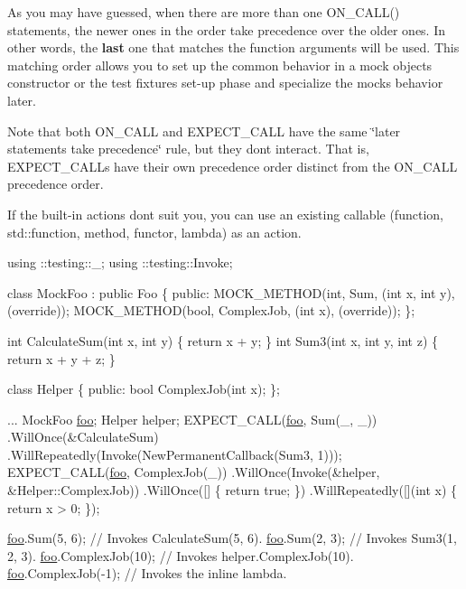 As you may have guessed, when there are more than one {\ttfamily O\+N\+\_\+\+C\+A\+L\+L()} statements, the newer ones in the order take precedence over the older ones. In other words, the {\bfseries last} one that matches the function arguments will be used. This matching order allows you to set up the common behavior in a mock object\textquotesingle{}s constructor or the test fixture\textquotesingle{}s set-\/up phase and specialize the mock\textquotesingle{}s behavior later.

Note that both {\ttfamily O\+N\+\_\+\+C\+A\+LL} and {\ttfamily E\+X\+P\+E\+C\+T\+\_\+\+C\+A\+LL} have the same \char`\"{}later statements take
precedence\char`\"{} rule, but they don\textquotesingle{}t interact. That is, {\ttfamily E\+X\+P\+E\+C\+T\+\_\+\+C\+A\+LL}s have their own precedence order distinct from the {\ttfamily O\+N\+\_\+\+C\+A\+LL} precedence order.

If the built-\/in actions don\textquotesingle{}t suit you, you can use an existing callable (function, {\ttfamily std\+::function}, method, functor, lambda) as an action.


\begin{DoxyCode}
using ::testing::\_; using ::testing::Invoke;

\textcolor{keyword}{class }MockFoo : \textcolor{keyword}{public} Foo \{
 \textcolor{keyword}{public}:
  MOCK\_METHOD(\textcolor{keywordtype}{int}, Sum, (\textcolor{keywordtype}{int} x, \textcolor{keywordtype}{int} y), (\textcolor{keyword}{override}));
  MOCK\_METHOD(\textcolor{keywordtype}{bool}, ComplexJob, (\textcolor{keywordtype}{int} x), (\textcolor{keyword}{override}));
\};

\textcolor{keywordtype}{int} CalculateSum(\textcolor{keywordtype}{int} x, \textcolor{keywordtype}{int} y) \{ \textcolor{keywordflow}{return} x + y; \}
\textcolor{keywordtype}{int} Sum3(\textcolor{keywordtype}{int} x, \textcolor{keywordtype}{int} y, \textcolor{keywordtype}{int} z) \{ \textcolor{keywordflow}{return} x + y + z; \}

\textcolor{keyword}{class }Helper \{
 \textcolor{keyword}{public}:
  \textcolor{keywordtype}{bool} ComplexJob(\textcolor{keywordtype}{int} x);
\};

...
  MockFoo \mbox{\hyperlink{namespacefoo}{foo}};
  Helper helper;
  EXPECT\_CALL(\mbox{\hyperlink{namespacefoo}{foo}}, Sum(\_, \_))
      .WillOnce(&CalculateSum)
      .WillRepeatedly(Invoke(NewPermanentCallback(Sum3, 1)));
  EXPECT\_CALL(\mbox{\hyperlink{namespacefoo}{foo}}, ComplexJob(\_))
      .WillOnce(Invoke(&helper, &Helper::ComplexJob))
      .WillOnce([] \{ \textcolor{keywordflow}{return} \textcolor{keyword}{true}; \})
      .WillRepeatedly([](\textcolor{keywordtype}{int} x) \{ \textcolor{keywordflow}{return} x > 0; \});

  \mbox{\hyperlink{namespacefoo}{foo}}.Sum(5, 6);         \textcolor{comment}{// Invokes CalculateSum(5, 6).}
  \mbox{\hyperlink{namespacefoo}{foo}}.Sum(2, 3);         \textcolor{comment}{// Invokes Sum3(1, 2, 3).}
  \mbox{\hyperlink{namespacefoo}{foo}}.ComplexJob(10);    \textcolor{comment}{// Invokes helper.ComplexJob(10).}
  \mbox{\hyperlink{namespacefoo}{foo}}.ComplexJob(-1);    \textcolor{comment}{// Invokes the inline lambda.}
\end{DoxyCode}


